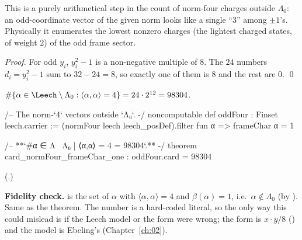 \begin{physics}
This is a purely arithmetical step in the count of norm-four charges outside $\Lambda_0$: an odd-coordinate vector of the given norm looks like a single ``$3$'' among $\pm1$'s. Physically it enumerates the lowest nonzero charges (the lightest charged states, of weight $2$) of the odd frame sector.
\end{physics}
\emph{Proof.}  For odd $y_i$, $y_i^2-1$ is a non-negative multiple of $8$.  The $24$ numbers
$d_i=y_i^2-1$ sum to $32-24=8$, so exactly one of them is $8$ and the rest are $0$. \qed

\begin{theorem}\label{ch11:thm:oddfour}
$\#\{\alpha\in\Leech\setminus\Lambda_0:\langle\alpha,\alpha\rangle=4\}=24\cdot2^{12}=98304$.
\end{theorem}
\begin{leancode}
/-- The norm-`4` vectors outside `Λ₀`. -/
noncomputable def oddFour : Finset leech.carrier :=
  (normFour leech leech_posDef).filter fun α => frameChar α = 1

/-- **`#{α ∈ Λ \ Λ₀ | ⟨α,α⟩ = 4} = 98304`.** -/
theorem card_normFour_frameChar_one : oddFour.card = 98304
\end{leancode}
(.)
\begin{dictionary}
\textbf{Fidelity check.}   is the set of $\alpha$ with $\langle\alpha,\alpha\rangle=4$ and
$\beta(\alpha)=1$, i.e.\ $\alpha\notin\Lambda_0$ (by ).  Same as the theorem.  The
number is a hard-coded literal, so the only way this could mislead is if the Leech model or the
form were wrong; the form is $x\cdot y/8$ () and the model is Ebeling's
(Chapter~\ref{ch:02}).
\end{dictionary}

